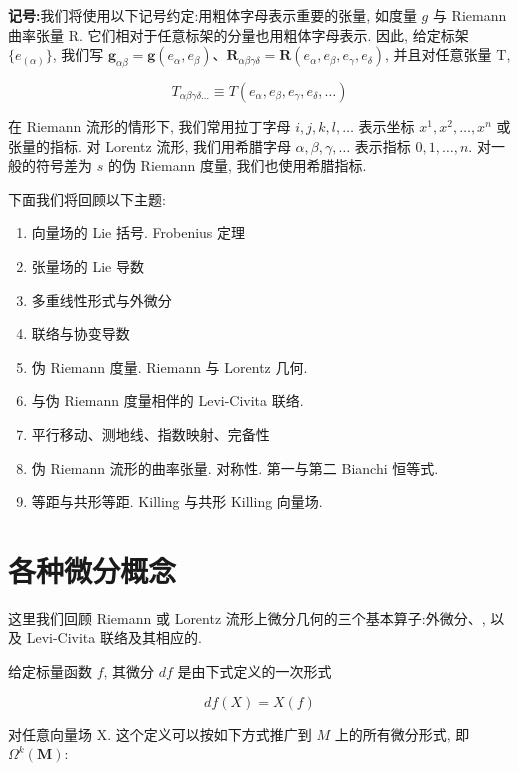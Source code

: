 \par\noindent\textbf{记号:}我们将使用以下记号约定:用粗体字母表示重要的张量, 如度量 $g$ 与 Riemann 曲率张量 R. 它们相对于任意标架的分量也用粗体字母表示. 因此, 给定标架 $\{e_{(\alpha)}\}$, 我们写 $\mathbf{g}_{\alpha\beta} = \mathbf{g}(e_{\alpha}, e_{\beta})$、$\mathbf{R}_{\alpha\beta\gamma\delta} = \mathbf{R}(e_{\alpha}, e_{\beta}, e_{\gamma}, e_{\delta})$, 并且对任意张量 T,

\[
T_{\alpha\beta\gamma\delta\dots} \equiv T(e_{\alpha}, e_{\beta}, e_{\gamma}, e_{\delta}, \dots)
\]

在 Riemann 流形的情形下, 我们常用拉丁字母 $i, j, k, l, \ldots$ 表示坐标 $x^{1}, x^{2}, \ldots, x^{n}$ 或张量的指标. 对 Lorentz 流形, 我们用希腊字母 $\alpha, \beta, \gamma, \ldots$ 表示指标 $0, 1, \ldots, n$. 对一般的符号差为 $s$ 的伪 Riemann 度量, 我们也使用希腊指标.

下面我们将回顾以下主题:

\begin{enumerate}
\renewcommand{\labelenumi}{\arabic{enumi}.)}
\item 向量场的 Lie 括号. Frobenius 定理
\item 张量场的 Lie 导数
\item 多重线性形式与外微分
\item 联络与协变导数
\item 伪 Riemann 度量. Riemann 与 Lorentz 几何.
\item 与伪 Riemann 度量相伴的 Levi-Civita 联络.
\item 平行移动、测地线、指数映射、完备性
\item 伪 Riemann 流形的曲率张量. 对称性. 第一与第二 Bianchi 恒等式.
\item 等距与共形等距. Killing 与共形 Killing 向量场.
\end{enumerate}


\section{各种微分概念}

这里我们回顾 Riemann 或 Lorentz 流形上微分几何的三个基本算子:外微分、, 以及 Levi-Civita 联络及其相应的.


给定标量函数 $f$, 其微分 $df$ 是由下式定义的一次形式

\[
df(X) = X(f)
\]

对任意向量场 X. 这个定义可以按如下方式推广到 $M$ 上的所有微分形式, 即 $\Omega^{k}(\mathbf{M})$:

